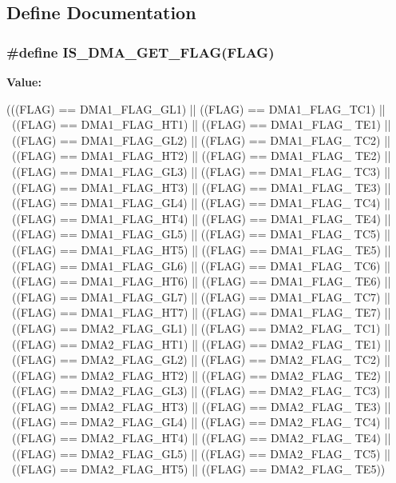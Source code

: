 \subsection{Define Documentation}
\hypertarget{group__DMA__flags__definition_ga98e421aa0a15fbeecb4cab3612985676}{
\subsubsection[{IS\_\-DMA\_\-GET\_\-FLAG}]{\setlength{\rightskip}{0pt plus 5cm}\#define IS\_\-DMA\_\-GET\_\-FLAG(FLAG)}}
\label{group__DMA__flags__definition_ga98e421aa0a15fbeecb4cab3612985676}
{\bfseries Value:}
\begin{DoxyCode}
(((FLAG) == DMA1_FLAG_GL1) || ((FLAG) == DMA1_FLAG_TC1) || \
                               ((FLAG) == DMA1_FLAG_HT1) || ((FLAG) == DMA1_FLAG_
      TE1) || \
                               ((FLAG) == DMA1_FLAG_GL2) || ((FLAG) == DMA1_FLAG_
      TC2) || \
                               ((FLAG) == DMA1_FLAG_HT2) || ((FLAG) == DMA1_FLAG_
      TE2) || \
                               ((FLAG) == DMA1_FLAG_GL3) || ((FLAG) == DMA1_FLAG_
      TC3) || \
                               ((FLAG) == DMA1_FLAG_HT3) || ((FLAG) == DMA1_FLAG_
      TE3) || \
                               ((FLAG) == DMA1_FLAG_GL4) || ((FLAG) == DMA1_FLAG_
      TC4) || \
                               ((FLAG) == DMA1_FLAG_HT4) || ((FLAG) == DMA1_FLAG_
      TE4) || \
                               ((FLAG) == DMA1_FLAG_GL5) || ((FLAG) == DMA1_FLAG_
      TC5) || \
                               ((FLAG) == DMA1_FLAG_HT5) || ((FLAG) == DMA1_FLAG_
      TE5) || \
                               ((FLAG) == DMA1_FLAG_GL6) || ((FLAG) == DMA1_FLAG_
      TC6) || \
                               ((FLAG) == DMA1_FLAG_HT6) || ((FLAG) == DMA1_FLAG_
      TE6) || \
                               ((FLAG) == DMA1_FLAG_GL7) || ((FLAG) == DMA1_FLAG_
      TC7) || \
                               ((FLAG) == DMA1_FLAG_HT7) || ((FLAG) == DMA1_FLAG_
      TE7) || \
                               ((FLAG) == DMA2_FLAG_GL1) || ((FLAG) == DMA2_FLAG_
      TC1) || \
                               ((FLAG) == DMA2_FLAG_HT1) || ((FLAG) == DMA2_FLAG_
      TE1) || \
                               ((FLAG) == DMA2_FLAG_GL2) || ((FLAG) == DMA2_FLAG_
      TC2) || \
                               ((FLAG) == DMA2_FLAG_HT2) || ((FLAG) == DMA2_FLAG_
      TE2) || \
                               ((FLAG) == DMA2_FLAG_GL3) || ((FLAG) == DMA2_FLAG_
      TC3) || \
                               ((FLAG) == DMA2_FLAG_HT3) || ((FLAG) == DMA2_FLAG_
      TE3) || \
                               ((FLAG) == DMA2_FLAG_GL4) || ((FLAG) == DMA2_FLAG_
      TC4) || \
                               ((FLAG) == DMA2_FLAG_HT4) || ((FLAG) == DMA2_FLAG_
      TE4) || \
                               ((FLAG) == DMA2_FLAG_GL5) || ((FLAG) == DMA2_FLAG_
      TC5) || \
                               ((FLAG) == DMA2_FLAG_HT5) || ((FLAG) == DMA2_FLAG_
      TE5))
\end{DoxyCode}
